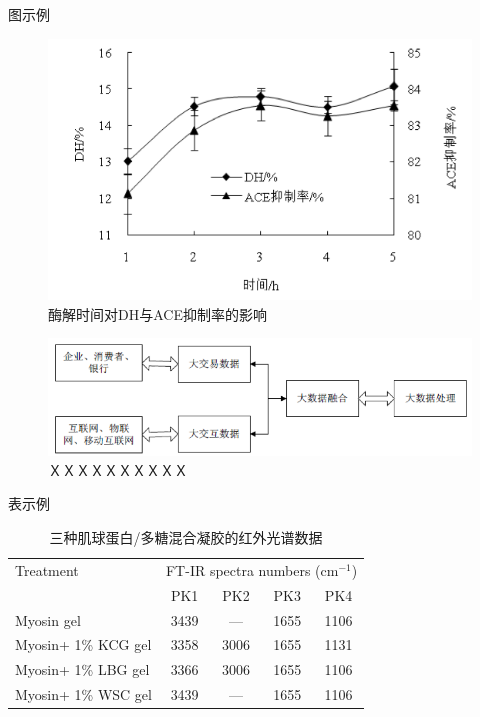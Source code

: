 图示例
\begin{figure}[!htb]
	\centering
	\includegraphics{images/example_figure1.png}
	\caption{酶解时间对DH与ACE抑制率的影响}
\end{figure}

\begin{figure}[!htb]
	\centering
	\includegraphics{images/example_figure2.png}
	\caption{ＸＸＸＸＸＸＸＸＸＸ}
\end{figure}

\clearpage
表示例
\begin{table}[!htb]
\centering
\caption{三种肌球蛋白/多糖混合凝胶的红外光谱数据}
\begin{tabular}{lcccc}
\hline
Treatment           & \multicolumn{4}{c}{FT-IR spectra numbers (cm$^{−1}$)} \\ \cline{2-5} 
                    & PK1        & PK2        & PK3        & PK4       \\ \hline
Myosin gel          & 3439       & —          & 1655       & 1106      \\
Myosin+ 1\% KCG gel & 3358       & 3006       & 1655       & 1131      \\
Myosin+ 1\% LBG gel & 3366       & 3006       & 1655       & 1106      \\
Myosin+ 1\% WSC gel & 3439       & —          & 1655       & 1106      \\ \hline
\end{tabular}
\end{table}

